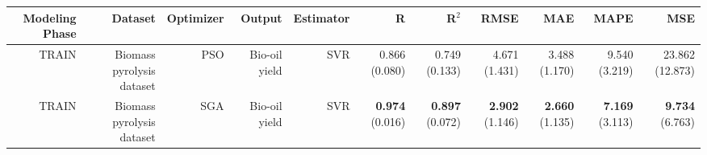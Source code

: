 \begin{table}
\centering
\label{eml___comparison_datasets_table_svr_biomass_pyrolysis_dataset_train.tex}
\begin{tabular}{rrrrrrrrrrr}
\toprule
Modeling Phase &                   Dataset & Optimizer &        Output & Estimator &                    R &                R$^2$ &                 RMSE &                  MAE &                 MAPE &                  MSE \\
\midrule
         TRAIN & Biomass pyrolysis dataset &       PSO & Bio-oil yield &       SVR &        0.866 (0.080) &        0.749 (0.133) &        4.671 (1.431) &        3.488 (1.170) &        9.540 (3.219) &      23.862 (12.873) \\
         TRAIN & Biomass pyrolysis dataset &       SGA & Bio-oil yield &       SVR & { \bf 0.974} (0.016) & { \bf 0.897} (0.072) & { \bf 2.902} (1.146) & { \bf 2.660} (1.135) & { \bf 7.169} (3.113) & { \bf 9.734} (6.763) \\
\bottomrule
\end{tabular}
\end{table}
